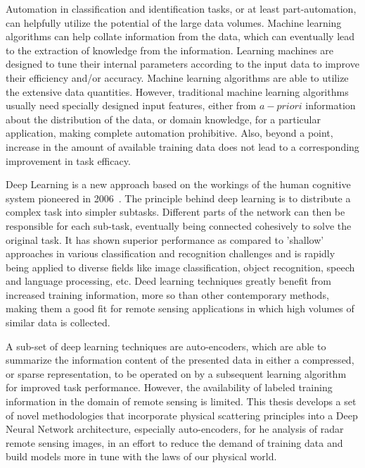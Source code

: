 \documentclass[12pt, a4paper]{article}
\begin{document}
Automation in classification and identification tasks, or at least part-automation, can helpfully utilize the potential of the large data volumes. Machine learning algorithms can help collate information from the data, which can eventually lead to the extraction of knowledge from the information. Learning machines are designed to tune their internal parameters according to the input data to improve their efficiency and/or accuracy. Machine learning algorithms are able to utilize the extensive data quantities. However, traditional machine learning algorithms usually need specially designed input features, either from $a-priori$ information about the distribution of the data, or domain knowledge, for a particular application, making complete automation prohibitive. Also, beyond a point, increase in the amount of available training data does not lead to a corresponding improvement in task efficacy.

Deep Learning is a new approach based on the workings of the human cognitive system pioneered in 2006~\cite{goodfellow2016deep}. The principle behind deep learning is to distribute a complex task into simpler subtasks. Different parts of the network can then be responsible for each sub-task, eventually being connected cohesively to solve the original task. It has shown superior performance as compared to 'shallow' approaches in various classification and recognition challenges and is rapidly being applied to diverse fields like image classification, object recognition, speech and language processing, etc. Deed learning techniques greatly benefit from increased training information, more so than other contemporary methods, making them a good fit for remote sensing applications in which high volumes of similar data is collected.  

A sub-set of deep learning techniques are auto-encoders, which are able to summarize the information content of the presented data in either a compressed, or sparse representation, to be operated on by a subsequent learning algorithm for improved task performance. However, the availability of labeled training information in the domain of remote sensing is limited. This thesis develops a set of novel methodologies that incorporate physical scattering principles into a Deep Neural Network architecture, especially auto-encoders, for he analysis of radar remote sensing images, in an effort to reduce the demand of training data and build models more in tune with the laws of our physical world.
\end{document}
